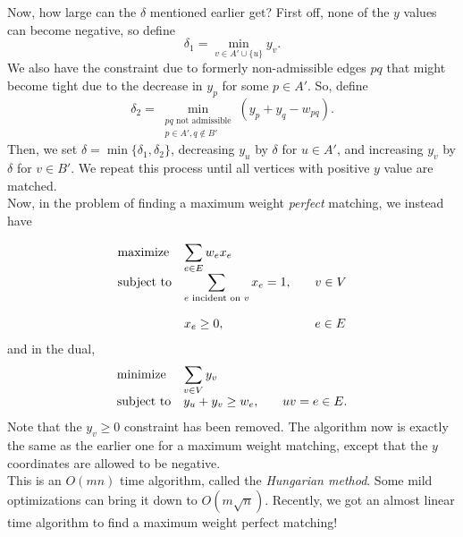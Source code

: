	Now, how large can the $\delta$ mentioned earlier get? First off, none of the $y$ values can become negative, so define
	\[ \delta_1 = \min_{v \in A' \cup \{u\}} y_v. \]
	We also have the constraint due to formerly non-admissible edges $pq$ that might become tight due to the decrease in $y_p$ for some $p \in A'$. So, define
	\[ \delta_2 = \min_{\substack{pq \text{ not admissible} \\ p \in A', q \not\in B'}} (y_p + y_q - w_{pq}). \]
	Then, we set $\delta = \min\{\delta_1,\delta_2\}$, decreasing $y_u$ by $\delta$ for $u \in A'$, and increasing $y_v$ by $\delta$ for $v \in B'$. We repeat this process until all vertices with positive $y$ value are matched.\\

	Now, in the problem of finding a maximum weight \emph{perfect} matching, we instead have

	\[
	\label{max-wt-pm-lp}
	\begin{array}{ll@{}ll}
	\text{maximize}  & \displaystyle\sum_{e \in E} w_{e} x_{e} &\\
	\text{subject to}& \displaystyle\sum\limits_{e \text{ incident on } v} x_{e} = 1,  &\qquad v \in V\\\\
	                 & x_{e} \ge 0,                                                &\qquad e \in E
	\end{array}
	\]
	and in the dual,
	\[
	\label{dual-max-wt-pm-lp}
	\begin{array}{ll@{}ll}
	\text{minimize}  & \displaystyle\sum_{v \in V} y_v &\\
	\text{subject to} \displaystyle &y_u+y_v \ge w_e,  &\qquad uv = e \in E.
	\end{array}
	\]
	Note that the $y_v \ge 0$ constraint has been removed. The algorithm now is exactly the same as the earlier one for a maximum weight matching, except that the $y$ coordinates are allowed to be negative.\\

	This is an $O(mn)$ time algorithm, called the \emph{Hungarian method}. Some mild optimizations can bring it down to $O(m\sqrt{n})$. Recently, we got an almost linear time algorithm to find a maximum weight perfect matching! %

